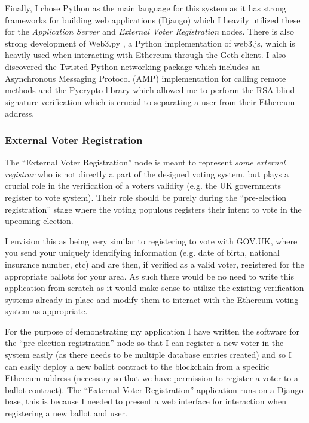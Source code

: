 \documentclass{article}
\begin{document}
Finally, I chose Python as the main language for this system as it has strong frameworks for building web applications (Django) which I heavily utilized these for the \textit{Application Server} and \textit{External Voter Registration} nodes. There is also strong development of Web3.py \citep{62_pipermerriam_web3.py_2017}, a Python implementation of web3.js, which is heavily used when interacting with Ethereum through the Geth client. I also discovered the Twisted Python networking package \citep{63_twisted_2017} which includes an Asynchronous Messaging Protocol (AMP) implementation for calling remote methods and the Pycrypto library which allowed me to perform the RSA blind signature verification which is crucial to separating a user from their Ethereum address.

\subsubsection{External Voter Registration}
The ``External Voter Registration'' node is meant to represent \textit{some external registrar} who is not directly a part of the designed voting system, but plays a crucial role in the verification of a voters validity (e.g. the UK governments register to vote system). Their role should be purely during the ``pre-election registration'' stage where the voting populous registers their intent to vote in the upcoming election. 

I envision this as being very similar to registering to vote with GOV.UK, where you send your uniquely identifying information (e.g. date of birth, national insurance number, etc) and are then, if verified as a valid voter, registered for the appropriate ballots for your area. As such there would be no need to write this application from scratch as it would make sense to utilize the existing verification systems already in place and modify them to interact with the Ethereum voting system as appropriate. 

For the purpose of demonstrating my application I have written the software for the ``pre-election registration'' node so that I can register a new voter in the system easily (as there needs to be multiple database entries created) and so I can easily deploy a new ballot contract to the blockchain from a specific Ethereum address (necessary so that we have permission to register a voter to a ballot contract). The ``External Voter Registration'' application runs on a Django base, this is because I needed to present a web interface for interaction when registering a new ballot and user.
\end{document}
